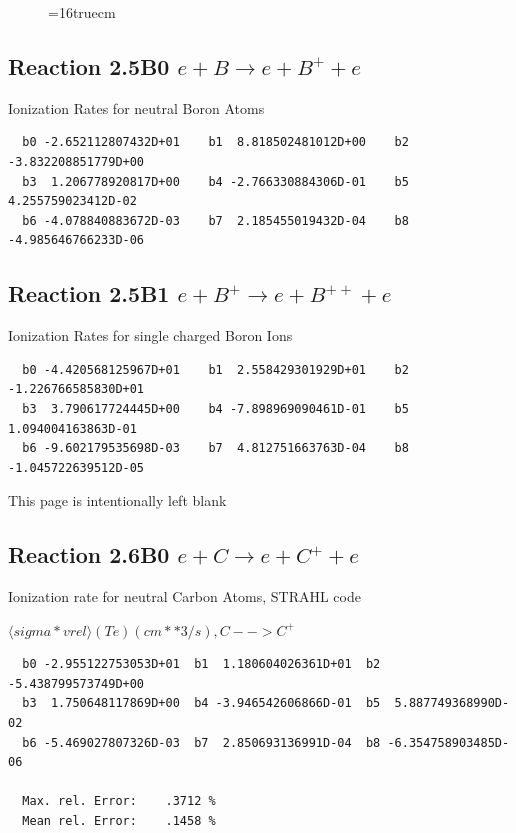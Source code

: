 \documentclass[12pt,dvipdfmx]{article}
\begin{document}
\begin{figure} \label{2.4B}
\epsfxsize=16truecm
\end{figure}
\newpage

\subsection{
Reaction 2.5B0   $e + B \rightarrow e + B^+ + e $
}

 Ionization Rates for neutral Boron Atoms


\begin{small}\begin{verbatim}
  b0 -2.652112807432D+01    b1  8.818502481012D+00    b2 -3.832208851779D+00
  b3  1.206778920817D+00    b4 -2.766330884306D-01    b5  4.255759023412D-02
  b6 -4.078840883672D-03    b7  2.185455019432D-04    b8 -4.985646766233D-06
\end{verbatim}\end{small}

\subsection{
Reaction 2.5B1   $e + B^+ \rightarrow e + B^{++} + e $
}

 Ionization Rates for single charged Boron Ions


\begin{small}\begin{verbatim}
  b0 -4.420568125967D+01    b1  2.558429301929D+01    b2 -1.226766585830D+01
  b3  3.790617724445D+00    b4 -7.898969090461D-01    b5  1.094004163863D-01
  b6 -9.602179535698D-03    b7  4.812751663763D-04    b8 -1.045722639512D-05
\end{verbatim}\end{small}

\newpage
This page is intentionally left blank
\newpage

\subsection{
Reaction 2.6B0   $e + C \rightarrow e + C^+ + e  $
}

  Ionization rate for neutral Carbon Atoms, STRAHL code

  $ \langle sigma*vrel \rangle(Te)  (cm**3/s), C --> C^+$

\begin{small}\begin{verbatim}
  b0 -2.955122753053D+01  b1  1.180604026361D+01  b2 -5.438799573749D+00
  b3  1.750648117869D+00  b4 -3.946542606866D-01  b5  5.887749368990D-02
  b6 -5.469027807326D-03  b7  2.850693136991D-04  b8 -6.354758903485D-06

  Max. rel. Error:    .3712 %
  Mean rel. Error:    .1458 %





\end{verbatim}\end{small}
\end{document}
